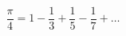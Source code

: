 \documentclass[12pt]{article}
\begin{document}
\sicpsize
\[
\frac{\pi}{4} = 1 - \frac{1}{3} + \frac{1}{5} - \frac{1}{7} + \dots
\]
\end{document}
